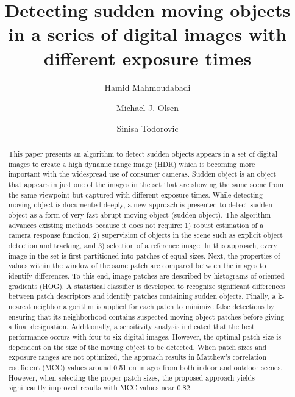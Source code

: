 \documentclass[preprint,12pt,3p]{elsarticle}
\begin{document}
\begin{frontmatter}

\title{Detecting sudden moving objects in a series of digital images with different exposure times}


\author[label1]{Hamid Mahmoudabadi}



\author[label1]{Michael J. Olsen}
\address[label1]{Oregon State University, Corvallis, OR, USA}

\author[label1]{Sinisa Todorovic}

\begin{abstract}
	
This paper presents an algorithm to detect sudden objects appears in a set of digital images to create a high dynamic range image (HDR) which is becoming more important with the widespread use of consumer cameras.  Sudden object is an object that appears in just one of the images in the set that are showing the same scene from the same viewpoint but captured with different exposure times. While detecting moving object is documented deeply, a new approach is presented to detect sudden object as a form of very fast abrupt moving object (sudden object). The algorithm advances existing methods because it does not require: 1) robust estimation of a camera response function, 2) supervision of objects in the scene such as explicit object detection and tracking, and 3) selection of a reference image. In this approach, every image in the set is first partitioned into patches of equal sizes. Next, the properties of values within the window of the same patch are compared between the images to identify differences. To this end, image patches are described by histograms of oriented gradients (HOG). A statistical classifier is developed to recognize significant differences between patch descriptors and identify patches containing sudden objects. Finally, a k-nearest neighbor algorithm is applied for each patch to minimize false detections by ensuring that its neighborhood contains suspected moving object patches before giving a final designation. Additionally, a sensitivity analysis indicated that the best performance occurs with four to six digital images.  However, the optimal patch size is dependent on the size  of the moving object to be detected. When patch sizes and exposure ranges are not optimized, the approach results in Matthew's correlation coefficient (MCC) values around 0.51 on images from both indoor and outdoor scenes. However, when selecting the proper patch sizes, the proposed approach yields significantly improved results with MCC values near 0.82. 


\end{abstract}
\end{frontmatter}
\end{document}
